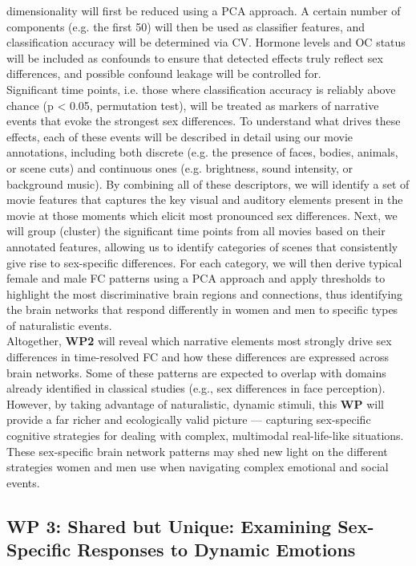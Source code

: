 \documentclass[11pt,a4paper]{article}
\begin{document}
dimensionality will first be reduced using a PCA approach. A certain number of components (e.g. the first 50) 
will then be used as classifier features, and classification accuracy will be determined via CV. Hormone levels and OC status will be
included as confounds to ensure that detected effects truly reflect 
sex differences, and possible confound leakage \parencite{hamdanConfoundleakageConfoundRemoval2022a} will be controlled for.\\
Significant time points, i.e. those where classification accuracy is reliably above chance (p < 0.05, permutation test), 
will be treated as markers of narrative events that evoke the strongest sex differences. To understand what drives these effects, 
each of these events will be described in detail using our movie annotations, including both discrete 
(e.g. the presence of faces, bodies, animals, or scene cuts) and continuous ones (e.g. brightness, 
sound intensity, or background music). By combining all of these descriptors, we will identify a 
set of movie features that captures the key visual and auditory elements present in the movie at those moments which 
elicit most pronounced sex differences.
Next, we will group (cluster) the significant time points from all movies based on their annotated features, allowing us to 
identify categories of scenes that consistently give rise to sex-specific differences. For each category, we will then 
derive typical female and male FC patterns using a PCA approach and apply thresholds to highlight the most discriminative brain regions 
and connections, thus identifying the brain networks that respond differently in women and men to specific 
types of naturalistic events.\\
Altogether, \textbf{WP2} will reveal which narrative elements most strongly drive sex differences in time-resolved FC and how 
these differences are expressed across brain networks. Some of these patterns are expected to overlap with domains already 
identified in classical studies (e.g., sex differences in face perception). However, by taking advantage of naturalistic, dynamic stimuli, 
this \textbf{WP} will provide a far richer and ecologically valid picture — capturing sex-specific cognitive strategies for dealing with 
complex, multimodal real-life-like situations. These sex-specific brain network patterns may shed new light on the 
different strategies women and men use when navigating complex emotional and social events.

\subsection*{WP 3: Shared but Unique: Examining Sex-Specific Responses to Dynamic Emotions}
\end{document}
